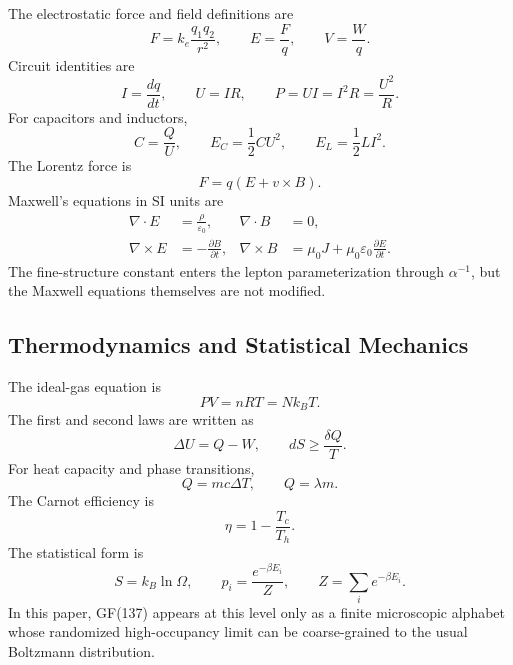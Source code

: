 \documentclass[11pt]{article}
\begin{document}
The electrostatic force and field definitions are
\begin{equation}
    F=k_e\frac{q_1q_2}{r^2},\qquad
    E=\frac{F}{q},\qquad
    V=\frac{W}{q}.
\end{equation}
Circuit identities are
\begin{equation}
    I=\frac{dq}{dt},\qquad
    U=IR,\qquad
    P=UI=I^2R=\frac{U^2}{R}.
\end{equation}
For capacitors and inductors,
\begin{equation}
    C=\frac{Q}{U},\qquad
    E_C=\frac{1}{2}CU^2,\qquad
    E_L=\frac{1}{2}LI^2.
\end{equation}
The Lorentz force is
\begin{equation}
    F=q(E+v\times B).
\end{equation}
Maxwell's equations in SI units are
\begin{align}
    \nabla\cdot E&=\frac{\rho}{\varepsilon_0},&
    \nabla\cdot B&=0,\\
    \nabla\times E&=-\frac{\partial B}{\partial t},&
    \nabla\times B&=\mu_0J+\mu_0\varepsilon_0\frac{\partial E}{\partial t}.
\end{align}
The fine-structure constant enters the lepton parameterization through
$\alpha^{-1}$, but the Maxwell equations themselves are not modified.

\subsection{Thermodynamics and Statistical Mechanics}

The ideal-gas equation is
\begin{equation}
    PV=nRT=Nk_BT.
\end{equation}
The first and second laws are written as
\begin{equation}
    \Delta U=Q-W,\qquad
    dS\ge \frac{\delta Q}{T}.
\end{equation}
For heat capacity and phase transitions,
\begin{equation}
    Q=mc\Delta T,\qquad
    Q=\lambda m.
\end{equation}
The Carnot efficiency is
\begin{equation}
    \eta=1-\frac{T_c}{T_h}.
\end{equation}
The statistical form is
\begin{equation}
    S=k_B\ln\Omega,\qquad
    p_i=\frac{e^{-\beta E_i}}{Z},\qquad
    Z=\sum_i e^{-\beta E_i}.
\end{equation}
In this paper, GF(137) appears at this level only as a finite microscopic
alphabet whose randomized high-occupancy limit can be coarse-grained to the
usual Boltzmann distribution.
\end{document}
